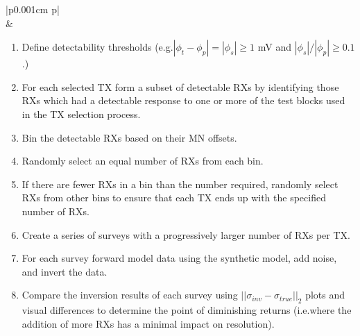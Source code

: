 \documentclass[preprint,authoryear,12pt]{elsarticle}
\providecommand{\DIFaddtex}[1]{{\protect\color{blue}\uwave{#1}}} %
\providecommand{\DIFaddFL}[1]{\DIFadd{#1}} %
\providecommand{\DIFaddbeginFL}{} %
\providecommand{\DIFaddendFL}{} %
\providecommand{\DIFadd}[1]{\texorpdfstring{\DIFaddtex{#1}}{#1}} %
\begin{document}
\begin{table}
   \scriptsize
   \begin{tabular} {|p{0.001cm} p{\linewidth}|}
      \hline
       \\
       &
         \begin{enumerate}[leftmargin=*]
            \item Define detectability thresholds (e.g.\DIFaddbeginFL \DIFaddFL{, }\DIFaddendFL $|\phi_t - \phi_p| = |\phi_s| \geq 1$ mV and  $|\phi_s|/|\phi_p| \geq 0.1$.)
            \item For each selected TX form a subset of detectable RXs by identifying those RXs which had a detectable response to one or more of the test blocks used in the TX selection process.
            \item Bin the detectable RXs based on their MN offsets.
            \item Randomly select an equal number of RXs from each bin.
            \item  If there are fewer RXs in a bin than the number required, randomly select RXs from other bins to ensure that each TX ends up with the specified number of RXs.
            \item Create a series of surveys with a progressively larger number of RXs per TX.
            \item For each survey forward model data using the synthetic model, add noise, and invert the data.
            \item Compare the inversion results of each survey using $\left|| \sigma_{inv} - \sigma_{true} \right||_2$ plots and visual differences to determine the point of diminishing returns (i.e.\DIFaddbeginFL \DIFaddFL{,  }\DIFaddendFL where the addition of more RXs has a minimal impact on resolution).
         \end{enumerate} \\
      \hline
   \end{tabular}
   \caption{Workflow summarizing the steps in the data-based RX selection methodology.}
   \label{table:RX_Selection_Methodology}
\end{table}
\end{document}
